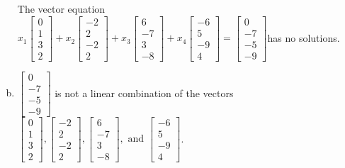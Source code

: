 \begin{exerciseAnswer}
\begin{enumerate}[(a)]
\begin{center}
\begin{minipage}{0.8\textwidth}
 The vector equation \( x_{1} \left[\begin{array}{c}
0 \\
1 \\
3 \\
2
\end{array}\right] + x_{2} \left[\begin{array}{c}
-2 \\
2 \\
-2 \\
2
\end{array}\right] + x_{3} \left[\begin{array}{c}
6 \\
-7 \\
3 \\
-8
\end{array}\right] + x_{4} \left[\begin{array}{c}
-6 \\
5 \\
-9 \\
4
\end{array}\right] = \left[\begin{array}{c}
0 \\
-7 \\
-5 \\
-9
\end{array}\right] \)has no solutions.
\end{minipage}\end{center}
    
\item 

\( \left[\begin{array}{c}
0 \\
-7 \\
-5 \\
-9
\end{array}\right] \) is not a linear combination of the vectors \( \left[\begin{array}{c}
0 \\
1 \\
3 \\
2
\end{array}\right] , \left[\begin{array}{c}
-2 \\
2 \\
-2 \\
2
\end{array}\right] , \left[\begin{array}{c}
6 \\
-7 \\
3 \\
-8
\end{array}\right] , \text{ and } \left[\begin{array}{c}
-6 \\
5 \\
-9 \\
4
\end{array}\right] \). 


\end{enumerate}
    
\end{exerciseAnswer}
    
